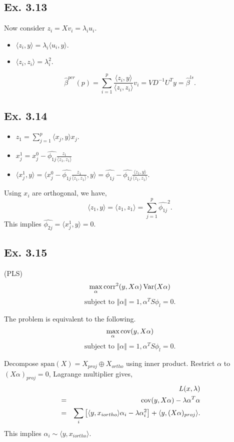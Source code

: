 \subsection*{Ex. 3.13}
Now consider $z_{i}=Xv_{i}=\lambda_{i}u_i$.
\begin{itemize}
    \item $\langle z_{i}, y\rangle=\lambda_{i}\langle u_{i}, y\rangle$.
    \item $\langle z_{i}, z_{i}\rangle=\lambda_{i}^2$.
\end{itemize}
$$\hat{\beta}^{pcr}(p)=\sum_{i=1}^p\frac{\langle z_{i}, y\rangle}{\langle z_{i}, z_{i}\rangle}v_i=VD^{-1}U^{T}y=\hat{\beta}^{ls}.$$

\subsection*{Ex. 3.14}
\begin{itemize}
    \item $z_{1} = \sum_{j=1}^{p}\langle x_{j}, y\rangle x_{j}$.
    \item $x_{j}^{1}=x_{j}^0-\widehat{\phi_{1j}}\frac{z_1}{\langle z_1, z_1\rangle}$
    \item $\langle x_{j}^{1}, y \rangle=\langle x_{j}^0-\widehat{\phi_{1j}}\frac{z_1}{\langle z_1, z_1\rangle}, y\rangle=\widehat{\phi_{1j}} - \widehat{\phi_{1j}}\frac{\langle z_1, y\rangle}{\langle z_1, z_1\rangle}. $
\end{itemize}
Using $x_{i}$ are orthogonal, we have,
$$\langle z_1, y\rangle = \langle z_1, z_1\rangle=\sum_{j=1}^p \widehat{\phi_{1j}}^2.$$
This implies $\widehat{\phi_{2j}} = \langle x_{j}^{1}, y \rangle =0.$

\subsection*{Ex. 3.15}
(PLS)
$$\max_{\alpha}\mbox{corr}^2(y, X\alpha)\operatorname*{\mbox{Var}}(X\alpha)$$
$$\mbox{subject to }\Vert\alpha\Vert=1, \alpha^T S \phi_{l}=0.$$

The problem is equivalent to the following.
$$\max_{\alpha}\operatorname*{\mbox{cov}}(y, X\alpha)$$
$$\mbox{subject to }\Vert\alpha\Vert=1, \alpha^T S \phi_{l}=0.$$

Decompose $\mbox{span}(X)=X_{proj}\oplus X_{ortho}$ using inner product. Restrict $\alpha$ to $(X\alpha)_{proj}=0$, Lagrange multiplier gives,
\begin{eqnarray*}
    && L(x, \lambda) \\
    &=& \operatorname*{\mbox{cov}}(y, X\alpha) - \lambda \alpha^T \alpha\\
    &=& \sum_{i}\left[\langle y, x_{iortho}\rangle \alpha_{i}- \lambda \alpha_i^2\right] + \langle y, (X\alpha)_{proj}\rangle.
\end{eqnarray*}
This implies $\alpha_i\sim \langle y, x_{iortho}\rangle.$

